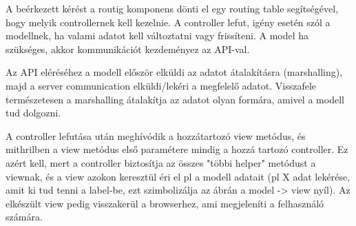 
A beérkezett kérést a routig komponens dönti el egy routing table segítségével, hogy melyik controllernek kell kezelnie. A controller lefut, igény esetén szól a modellnek, ha valami adatot kell változtatni vagy frissíteni. A model ha szükséges, akkor kommunikációt kezdeményez az API-val.

Az API eléréséhez a modell először elküldi az adatot átalakításra (marshalling), majd a server communication elküldi/lekéri a megfelelő adatot. Visszafele természetesen a marshalling átalakítja az adatot olyan formára, amivel a modell tud dolgozni.

A controller lefutása után meghívódik a hozzátartozó view metódus, és mithrilben a view metódus első paramétere mindig a hozzá tartozó controller. Ez azért kell, mert a controller biztosítja az összes "többi helper" metódust a viewnak, és a view azokon keresztül éri el pl a modell adatait (pl X adat lekérése, amit ki tud tenni a label-be, ezt szimbolizálja az ábrán a model -> view nyíl).  Az elkészült view pedig visszakerül a browserhez, ami megjeleníti a felhasználó számára.